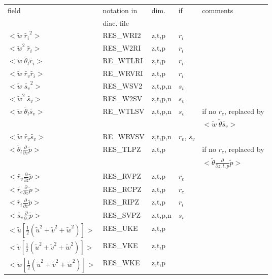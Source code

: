 \begin{center}
\begin{tabular}{||p{6cm}|>{\centering}p{2.5cm}|>{\centering}p{1.5cm}|>{\centering}p{0.5cm}|p{5cm }||}
\hline
\hline
field & notation in & dim. &   if  & comments \\
      & diac. file &           &  & \\
\hline
\hline
$<\tilde{w}\;\tilde{r_i}^2>$ & RES\_WRI2 &z,t,p &  $r_i$ &\\
\cline{1-4}
$<\tilde{w}^2\;\tilde{r_i}>$ & RES\_W2RI &z,t,p &  $r_i$ &\\
\cline{1-4}
$<\tilde{w}\;\tilde{\theta_l}\tilde{r_i}>$ & RE\_WTLRI &z,t,p &  $r_i$ &\\
\cline{1-4}
$<\tilde{w}\;\tilde{r_v}\tilde{r_i}>$ & RE\_WRVRI &z,t,p &  $r_i$ & \\
\cline{1-4}
$<\tilde{w}\;\tilde{s_v}^2>$ & RES\_WSV2 &z,t,p,n &  $s_v$ &\\
\cline{1-4}
$<\tilde{w}^2\;\tilde{s_v}>$ & RES\_W2SV &z,t,p,n & $s_v$ &\\
\cline{1-5}
$<\tilde{w}\;\tilde{\theta_l}\tilde{s_v}>$ & RE\_WTLSV &z,t,p,n &  $s_v$ & if no $r_c$, replaced by \\
&&&&$<\tilde{w}\;\tilde{\theta}\tilde{s_v}>$ \\
\cline{1-5}
$<\tilde{w}\;\tilde{r_v}\tilde{s_v}>$ & RE\_WRVSV &z,t,p,n  & $r_v$, $s_v$ & \\
\cline{1-5}
$<\tilde{\theta_l}\frac{\partial}{\partial z}\tilde{p}>$ & RES\_TLPZ & z,t,p & & if no $r_c$, replaced by\\
&&&& $<\tilde{\theta}\frac{\partial}{\partial z,t,p}\tilde{p}>$ \\
\cline{1-5}
$<\tilde{r_v}\frac{\partial}{\partial z}\tilde{p}>$ & RES\_RVPZ & z,t,p & $r_v$  &\\
\cline{1-4}
$<\tilde{r_c}\frac{\partial}{\partial z}\tilde{p}>$ & RES\_RCPZ & z,t,p &  $r_c$  &\\
\cline{1-4}
$<\tilde{r_i}\frac{\partial}{\partial z}\tilde{p}>$ & RES\_RIPZ & z,t,p &  $r_i$  &\\
\cline{1-4}
$<\tilde{s_v}\frac{\partial}{\partial z}\tilde{p}>$ & RES\_SVPZ & z,t,p,n &  $s_v$  &\\
\cline{1-4}
$<\tilde{u}\left[\frac{1}{2}(\tilde{u}^2+\tilde{v}^2+\tilde{w}^2)\right]>$ & RES\_UKE & z,t,p &   &\\
\cline{1-4}
$<\tilde{v}\left[\frac{1}{2}(\tilde{u}^2+\tilde{v}^2+\tilde{w}^2)\right]>$ & RES\_VKE & z,t,p &   &\\
\cline{1-4}
$<\tilde{w}\left[\frac{1}{2}(\tilde{u}^2+\tilde{v}^2+\tilde{w}^2)\right]>$ & RES\_WKE & z,t,p &   &\\
\hline
\hline
\end{tabular}
\end{center}

